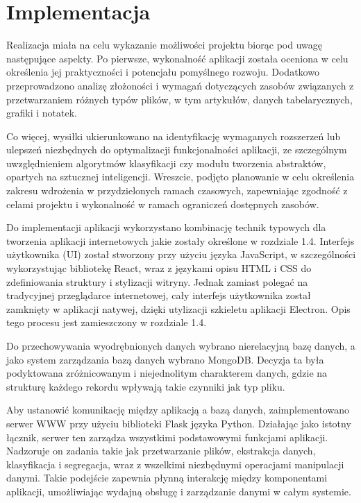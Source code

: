 \documentclass[12pt,a4paper,twoside]{article}
\begin{document}
\section{Implementacja}
Realizacja miała na celu wykazanie możliwości projektu biorąc pod uwagę następujące aspekty. 
Po pierwsze, wykonalność aplikacji została oceniona w celu określenia jej praktyczności i potencjału pomyślnego rozwoju.
Dodatkowo przeprowadzono analizę złożoności i wymagań dotyczących zasobów związanych z przetwarzaniem różnych typów plików, w tym artykułów, danych tabelarycznych, grafiki i notatek.\par
Co więcej, wysiłki ukierunkowano na identyfikację wymaganych rozszerzeń lub ulepszeń niezbędnych do optymalizacji funkcjonalności aplikacji, ze szczególnym uwzględnieniem algorytmów klasyfikacji czy modułu tworzenia abstraktów, opartych na sztucznej inteligencji.
Wreszcie, podjęto planowanie w celu określenia zakresu wdrożenia w przydzielonych ramach czasowych, zapewniając zgodność z celami projektu i wykonalność w ramach ograniczeń dostępnych zasobów.\par
Do implementacji aplikacji wykorzystano kombinację technik typowych dla tworzenia aplikacji internetowych jakie zostały określone w rozdziale 1.4. Interfejs użytkownika (UI) został stworzony przy użyciu języka JavaScript, w szczególności wykorzystując bibliotekę React, wraz z językami opisu HTML i CSS do zdefiniowania struktury i stylizacji witryny. Jednak zamiast polegać na tradycyjnej przeglądarce internetowej, cały interfejs użytkownika został zamknięty w aplikacji natywej, dzięki utylizacji szkieletu aplikacji Electron. Opis tego procesu jest zamieszczony w rozdziale 1.4.\par
Do przechowywania wyodrębnionych danych wybrano nierelacyjną bazę danych, a jako system zarządzania bazą danych wybrano MongoDB. Decyzja ta była podyktowana zróżnicowanym i niejednolitym charakterem danych, gdzie na strukturę każdego rekordu wpływają takie czynniki jak typ pliku.\par
Aby ustanowić komunikację między aplikacją a bazą danych, zaimplementowano serwer WWW przy użyciu biblioteki Flask języka Python. Działając jako istotny łącznik, serwer ten zarządza wszystkimi podstawowymi funkcjami aplikacji. Nadzoruje on zadania takie jak przetwarzanie plików, ekstrakcja danych, klasyfikacja i segregacja, wraz z wszelkimi niezbędnymi operacjami manipulacji danymi. Takie podejście zapewnia płynną interakcję między komponentami aplikacji, umożliwiając wydajną obsługę i zarządzanie danymi w całym systemie.\par
\end{document}
